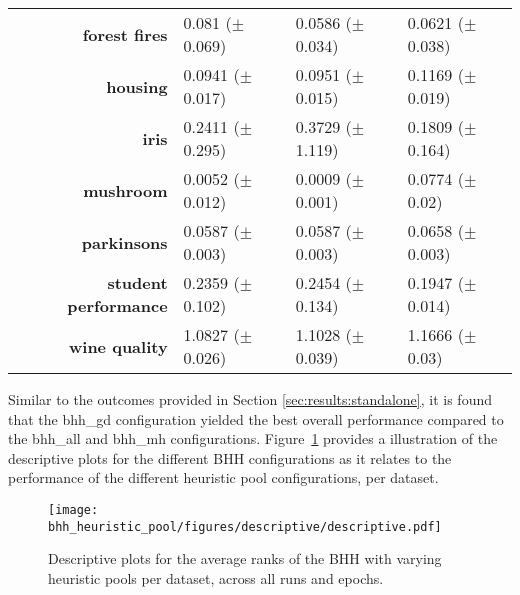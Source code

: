 \begin{table}[htbp]
{\begin{tabular}{r|lll}
			\textbf{forest fires}        & \cellcolor[rgb]{ .973,  .412,  .42}0.081 ($\pm$0.069)      & \cellcolor[rgb]{ .388,  .745,  .482}0.0586 ($\pm$0.034) & \cellcolor[rgb]{ 1,  .922,  .518}0.0621 ($\pm$0.038)    \\
			\textbf{housing}             & \cellcolor[rgb]{ .388,  .745,  .482}0.0941 ($\pm$0.017)    & \cellcolor[rgb]{ 1,  .922,  .518}0.0951 ($\pm$0.015)    & \cellcolor[rgb]{ .973,  .412,  .42}0.1169 ($\pm$0.019)  \\
			\textbf{iris}                & \cellcolor[rgb]{ 1,  .922,  .518}0.2411 ($\pm$0.295)       & \cellcolor[rgb]{ .973,  .412,  .42}0.3729 ($\pm$1.119)  & \cellcolor[rgb]{ .388,  .745,  .482}0.1809 ($\pm$0.164) \\
			\textbf{mushroom}            & \cellcolor[rgb]{ 1,  .922,  .518}0.0052 ($\pm$0.012)       & \cellcolor[rgb]{ .388,  .745,  .482}0.0009 ($\pm$0.001) & \cellcolor[rgb]{ .973,  .412,  .42}0.0774 ($\pm$0.02)   \\
			\textbf{parkinsons}          & \cellcolor[rgb]{ 1,  .922,  .518}0.0587 ($\pm$0.003)       & \cellcolor[rgb]{ .388,  .745,  .482}0.0587 ($\pm$0.003) & \cellcolor[rgb]{ .973,  .412,  .42}0.0658 ($\pm$0.003)  \\
			\textbf{student performance} & \cellcolor[rgb]{ 1,  .922,  .518}0.2359 ($\pm$0.102)       & \cellcolor[rgb]{ .973,  .412,  .42}0.2454 ($\pm$0.134)  & \cellcolor[rgb]{ .388,  .745,  .482}0.1947 ($\pm$0.014) \\
			\textbf{wine quality}        & \cellcolor[rgb]{ .388,  .745,  .482}1.0827 ($\pm$0.026)    & \cellcolor[rgb]{ 1,  .922,  .518}1.1028 ($\pm$0.039)    & \cellcolor[rgb]{ .973,  .412,  .42}1.1666 ($\pm$0.03)   \\
		\end{tabular}%

	}
\end{table}%

Similar to the outcomes provided in Section \ref{sec:results:standalone}, it is found that the bhh\_gd configuration yielded the best overall performance compared to the bhh\_all and bhh\_mh configurations. Figure~\ref{fig:results:heuristic_pool:descriptive:descriptive} provides a illustration of the descriptive plots for the different \acs{BHH} configurations as it relates to the performance of the different heuristic pool configurations, per dataset.

\begin{figure}[htbp]
	\centering
	\texttt{[image: bhh\_heuristic\_pool/figures/descriptive/descriptive.pdf]}
	\caption{Descriptive plots for the average ranks of the \acs{BHH} with varying heuristic pools per dataset, across all runs and epochs.}
	\label{fig:results:heuristic_pool:descriptive:descriptive}
\end{figure}

